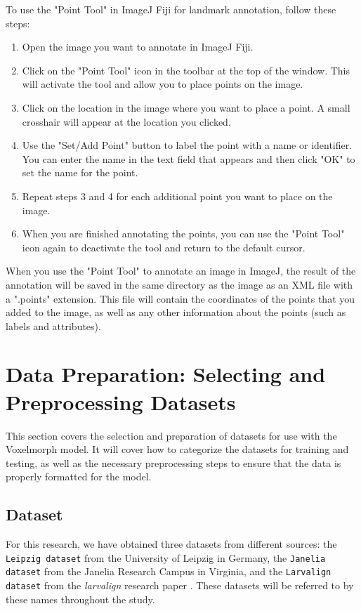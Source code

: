 \documentclass{book}
\begin{document}
	To use the "Point Tool" in ImageJ Fiji for landmark annotation, follow these steps:
	\begin{enumerate}
		\item Open the image you want to annotate in ImageJ Fiji.
		\item Click on the "Point Tool" icon in the toolbar at the top of the window. This will activate the tool and allow you to place points on the image.
		\item Click on the location in the image where you want to place a point. A small crosshair will appear at the location you clicked.
		\item Use the "Set/Add Point" button to label the point with a name or identifier. You can enter the name in the text field that appears and then click "OK" to set the name for the point.
		\item Repeat steps 3 and 4 for each additional point you want to place on the image.
		\item When you are finished annotating the points, you can use the "Point Tool" icon again to deactivate the tool and return to the default cursor.
	\end{enumerate}

	When you use the "Point Tool" to annotate an image in ImageJ, the result of the annotation will be saved in the same directory as the image as an XML file with a ".points" extension. This file will contain the coordinates of the points that you added to the image, as well as any other information about the points (such as labels and attributes).
	
	\section{Data Preparation: Selecting and Preprocessing Datasets}
	This section covers the selection and preparation of datasets for use with the Voxelmorph model. It will cover how to categorize the datasets for training and testing, as well as the necessary preprocessing steps to ensure that the data is properly formatted for the model.
	
	\subsection{Dataset}
	For this research, we have obtained three datasets from different sources: the \texttt{Leipzig dataset} from the University of Leipzig in Germany, the \texttt{Janelia dataset} from the Janelia Research Campus in Virginia, and the \texttt{Larvalign dataset} from the \textit{larvalign} research paper \cite{larvalign}. These datasets will be referred to by these names throughout the study.
	
\end{document}
